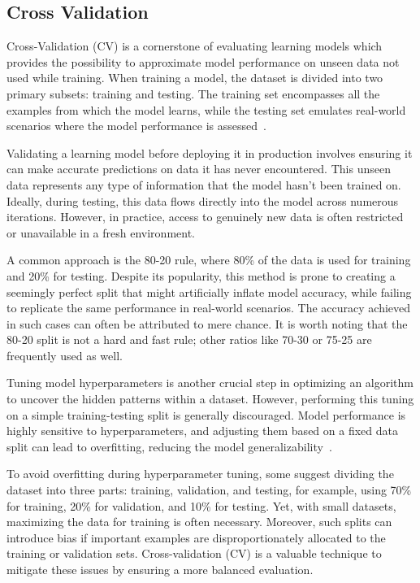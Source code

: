 \documentclass[12pt,a4paper]{report}
\begin{document}
\subsection{Cross Validation}
Cross-Validation (CV) is a cornerstone of evaluating learning models which provides the possibility to approximate model performance on unseen data not used while training. When training a model, the dataset is divided into two primary subsets: training and testing. The training set encompasses all the examples from which the model learns, while the testing set emulates real-world scenarios where the model performance is assessed~\cite{crossvalidation}.

Validating a learning model before deploying it in production involves ensuring it can make accurate predictions on data it has never encountered. This unseen data represents any type of information that the model hasn't been trained on. Ideally, during testing, this data flows directly into the model across numerous iterations. However, in practice, access to genuinely new data is often restricted or unavailable in a fresh environment.

A common approach is the 80-20 rule, where 80\% of the data is used for training and 20\% for testing. Despite its popularity, this method is prone to creating a seemingly perfect split that might artificially inflate model accuracy, while failing to replicate the same performance in real-world scenarios. The accuracy achieved in such cases can often be attributed to mere chance. It is worth noting that the 80-20 split is not a hard and fast rule; other ratios like 70-30 or 75-25 are frequently used as well.

Tuning model hyperparameters is another crucial step in optimizing an algorithm to uncover the hidden patterns within a dataset. However, performing this tuning on a simple training-testing split is generally discouraged. Model performance is highly sensitive to hyperparameters, and adjusting them based on a fixed data split can lead to overfitting, reducing the model generalizability~\cite{crossvalidation}.

To avoid overfitting during hyperparameter tuning, some suggest dividing the dataset into three parts: training, validation, and testing, for example, using 70\% for training, 20\% for validation, and 10\% for testing. Yet, with small datasets, maximizing the data for training is often necessary. Moreover, such splits can introduce bias if important examples are disproportionately allocated to the training or validation sets. Cross-validation (CV) is a valuable technique to mitigate these issues by ensuring a more balanced evaluation.
\end{document}

